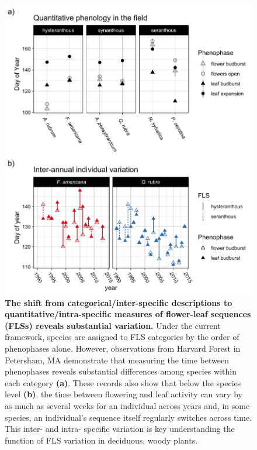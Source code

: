 \documentclass[12pt]{article}
\begin{document}
 \begin{figure}[h!]
        \centering
          \includegraphics[width=\textwidth]{..//HarvardForest/FLS_viz.jpeg}
          \caption{\textbf{The shift from categorical/inter-specific descriptions to quantitative/intra-specific measures of flower-leaf sequences (FLSs) reveals substantial variation.} Under the current framework, species are assigned to FLS categories by the order of phenophases alone. However, observations from Harvard Forest in Petersham, MA demonstrate that measuring the time between phenophases reveals substantial differences among species within each category \textbf{(a)}. These records also show that below the species level \textbf{(b)}, the time between flowering and leaf activity can vary by as much as several weeks for an individual across years and, in some species, an individual's sequence itself regularly switches across time. This inter- and intra- specific variation is key understanding the function of FLS variation in deciduous, woody plants.}
        \label{fig:vizzy}
    \end{figure}

\pagebreak  
\end{document}
